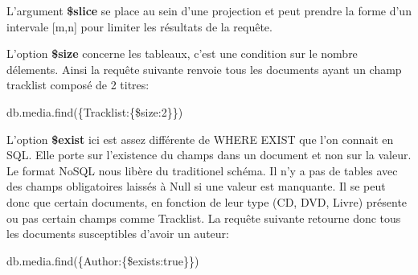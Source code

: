     \newline
    \par 
    L'argument \textbf{\$slice} se place au sein d'une projection et peut prendre la forme d'un intervale [m,n] pour limiter les résultats de la requête. \newline
    \par 
    L'option \textbf{\$size} concerne les tableaux, c'est une condition sur le nombre délements. Ainsi la requête suivante renvoie tous les documents ayant un champ tracklist composé de 2 titres:  \begin{tt} db.media.find(\{Tracklist:\{\$size:2\}\}) \end{tt} \newline
    \par 
    L'option \textbf{\$exist} ici est assez différente de WHERE EXIST que l'on connait en SQL. Elle porte sur l'existence du champs dans un document et non sur la valeur. Le format NoSQL nous libère du traditionel schéma. Il n'y a pas de tables avec des champs obligatoires laissés à Null si une valeur est manquante. Il se peut donc que certain documents, en fonction de leur type (CD, DVD, Livre) présente ou pas certain champs comme Tracklist. La requête suivante retourne donc tous les documents susceptibles d'avoir un auteur: \begin{tt} db.media.find(\{Author:\{\$exists:true\}\}) \end{tt} \newline